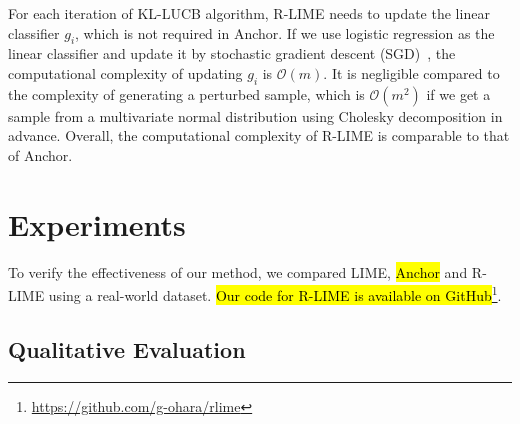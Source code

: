 \documentclass[runningheads]{llncs}
\begin{document}
{For each iteration of KL-LUCB algorithm, R-LIME needs to update
the linear classifier $g_i$, which is not required in Anchor.
If we use logistic regression as the linear classifier and update it
by stochastic gradient descent (SGD)~\cite{robbins1951stochastic},
the computational complexity of updating $g_i$ is $\mathcal{O}(m)$.
It is negligible compared to the complexity of generating a perturbed sample,
which is $\mathcal{O}(m^2)$ if we get a sample
from a multivariate normal distribution using Cholesky decomposition in advance.
Overall, the computational complexity of R-LIME is comparable to that of Anchor.

\section{Experiments}
To verify the effectiveness of our method,
we compared LIME, \hl{Anchor} and R-LIME using a real-world dataset.
\hl{Our code for R-LIME is available on GitHub}\footnote{\url{https://github.com/g-ohara/rlime}}.

\newpage
\subsection{Qualitative Evaluation}\label{sec:exp-qual}
}
\end{document}

